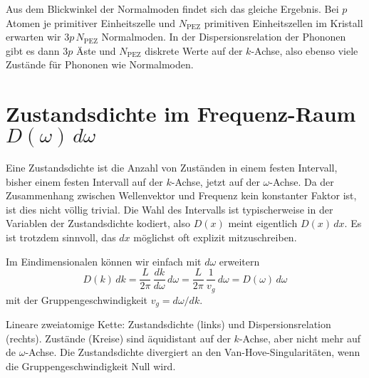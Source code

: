 Aus dem Blickwinkel der Normalmoden findet sich das gleiche Ergebnis. Bei $p$ Atomen je primitiver Einheitszelle und $N_\text{PEZ}$ primitiven Einheitszellen im Kristall erwarten wir $3 p \, N_\text{PEZ}$ Normalmoden. In der Dispersionsrelation der Phononen gibt es dann $3p$ Äste und $N_\text{PEZ}$ diskrete Werte auf der $k$-Achse, also ebenso viele Zustände für Phononen wie Normalmoden.




\section{Zustandsdichte im Frequenz-Raum $D(\omega) \, d\omega$ }

Eine Zustandsdichte ist die Anzahl von Zuständen in einem festen Intervall, bisher einem festen Intervall auf der $k$-Achse, jetzt auf der $\omega$-Achse. Da der Zusammenhang zwischen Wellenvektor und Frequenz kein konstanter Faktor ist, ist dies nicht völlig trivial. Die Wahl des Intervalls ist typischerweise in der Variablen der Zustandsdichte kodiert, also $D(x)$ meint eigentlich $D(x) \, dx$. Es ist trotzdem sinnvoll, das $dx$ möglichst oft explizit mitzuschreiben.

Im Eindimensionalen können wir einfach mit $d \omega$ erweitern
\begin{equation}
D(k) \, dk  =  \frac{L}{2 \pi}\, \frac{dk}{d\omega} \, d\omega 
= \frac{L}{2 \pi}\, \frac{1}{v_g} \, d\omega
= D(\omega) \, d\omega
\end{equation}
mit der Gruppengeschwindigkeit $v_g = d\omega / dk$.

\begin{marginfigure}

\caption{Lineare zweiatomige Kette:  Zustandsdichte (links) und Dispersionsrelation (rechts). Zustände (Kreise) sind äquidistant auf der $k$-Achse, aber nicht mehr auf de $\omega$-Achse. Die Zustandsdichte divergiert an den Van-Hove-Singularitäten, wenn die Gruppengeschwindigkeit Null wird.}
\end{marginfigure}



